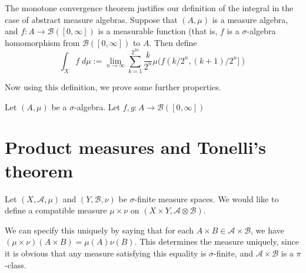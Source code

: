 \documentclass{owmaths}
\begin{document}
The monotone convergence theorem justifies our definition of the integral
in the case of abstract measure algebras. Suppose that $(A,\mu)$ is a measure algebra,
and $f:A\rightarrow \mathcal{B}([0,\infty])$ is a measurable function (that is,
$f$ is a $\sigma$-algebra homomorphism from $\mathcal{B}([0,\infty])$ to $A$. Then define
\begin{equation*}
    \int_X f\;d\mu := \lim_{n\rightarrow\infty} \sum_{k=1}^{2^{2n}} \frac{k}{2^n}\mu(f(k/2^n,(k+1)/2^n])
\end{equation*}

Now using this definition, we prove some further properties.
\begin{proposition}
    Let $(A,\mu)$ be a $\sigma$-algebra. Let $f,g:A\rightarrow\mathcal{B}([0,\infty])$
\end{proposition}

\section{Product measures and Tonelli's theorem}
Let $(X,\mathcal{A},\mu)$ and $(Y,\mathcal{B},\nu)$ be $\sigma$-finite measure
spaces. We would like to define a compatible measure $\mu\times\nu$ on $(X\times Y,\mathcal{A}\otimes \mathcal{B})$. 

We can specify this uniquely by saying that for each $A\times B \in \mathcal{A}\times \mathcal{B}$,
we have $(\mu\times \nu)(A\times B) = \mu(A)\nu(B)$. This determines
the measure uniquely, since it is obvious that any measure satisfying this equality
is $\sigma$-finite, and $\mathcal{A}\times\mathcal{B}$ is a $\pi$-class.
\end{document}
